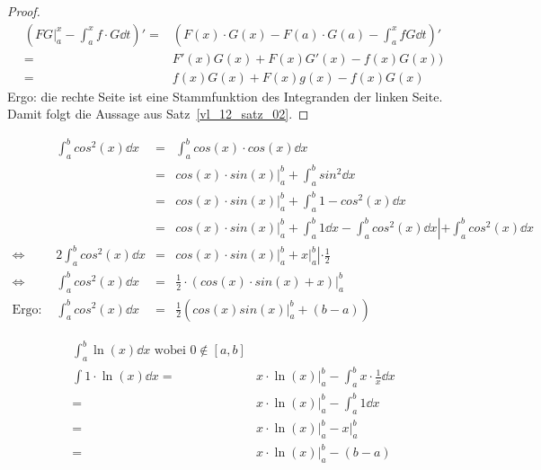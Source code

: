 \begin{proof}
	\begin{align*}
		\left( FG|_a^x - \int_a^x f \cdot G \dd{t} \right)' = &
		\left(F(x) \cdot G(x) - F(a) \cdot G(a) - \int_a^x fG \dd{t} \right)' \\
		= & F'(x)G(x) + F(x)G'(x) - f(x)G(x)) \\
		= & f(x)G(x) + F(x)g(x) -f(x)G(x)
	\end{align*}
	Ergo: die rechte Seite ist eine Stammfunktion des Integranden der 
	linken Seite. Damit folgt die Aussage aus Satz~\ref{vl_12_satz_02}.
\end{proof}

\begin{Beispiel}{
	\begin{align*}
		& \int_a^b cos^2(x) \dd{x} & = &  \int_a^b cos(x) \cdot cos(x) \dd{x} \\
		& &  = & \left. cos(x) \cdot sin(x) \right\vert_a^b + 
			\int_a^b sin^2 \dd{x} \\
		& & = & \left. cos(x) \cdot sin(x) \right\vert_a^b + 
			\int_a^b 1 - cos^2(x) \dd{x} \\
		& & = & \left. cos(x) \cdot sin(x) \right\vert_a^b 
			+ \int_a^b 1 \dd{x} - \int_a^b cos^2(x) \dd{x} 
			 \left\vert + \int_a^b cos^2(x) \dd{x} \right. \\
	 \Leftrightarrow 
	 & 2 \int_a^b cos^2(x) \dd{x} & = & \left. cos(x) \cdot sin(x) \right\vert_a^b 
	 	+ \left. x \right\vert_a^b  \left\vert \cdot \frac{1}{2} \right. \\
	 \Leftrightarrow
	& \int_a^b cos^2(x) \dd{x} & = & \frac{1}{2} \cdot 
		\left. \left( cos(x) \cdot sin(x) + x\right) \right\vert_a^b \\
	\text{Ergo: } & \int_a^b cos^2(x) \dd{x} & = & \frac{1}{2} (cos(x) sin(x) 
		\vert_a^b + (b-a))
	\end{align*}
	
	\begin{align*}
		\int_a^b \ln (x) \dd{x} \text{ wobei } 0 \not\in [a,b] \\
		\int 1 \cdot \ln (x) \dd{x} = & x \cdot \ln (x)\vert_a^b - 
		\int_a^b x \cdot \frac{1}{x} \dd{x} \\
		= & \left. x \cdot \ln (x) \right\vert_a^b - \int_a^b 1 \dd{x} \\
		= & \left. x \cdot \ln (x)\right\vert_a^b - \left. x\right\vert_a^b \\
		= & \left. x \cdot \ln (x)\right\vert_a^b - (b - a)
	\end{align*}
}\end{Beispiel}

